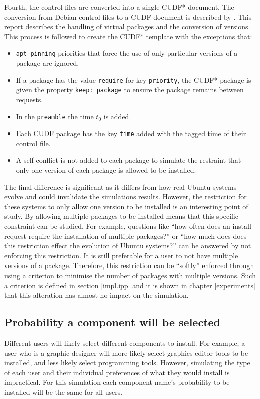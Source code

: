 Fourth, the control files are converted into a single CUDF* document.
The conversion from Debian control files to a CUDF document is described by \cite{abatetrenen2010}.
This report describes the handling of virtual packages and the conversion of versions. 
This process is followed to create the CUDF* template with the exceptions that:
\begin{itemize}
  \item \texttt{apt-pinning} priorities that force the use of only particular versions of a package are ignored.
  \item If a package has the value \texttt{require} for key \texttt{priority}, the CUDF* package is given the property \texttt{keep: package} to ensure the package remains between requests.
  \item In the \texttt{preamble} the time $t_0$ is added.
  \item Each CUDF package has the key \texttt{time} added with the tagged time of their control file.
  \item A self conflict is not added to each package to simulate the restraint that only one version of each package is allowed to be installed.
\end{itemize} 
The final difference is significant as it differs from how real Ubuntu systems evolve and could invalidate the simulations results.
However, the restriction for these systems to only allow one version to be installed is an interesting point of study.
By allowing multiple packages to be installed means that this specific constraint can be studied.
For example, questions like ``how often does an install request require the installation of multiple packages?'' 
or ``how much does does this restriction effect the evolution of Ubuntu systems?'' can be answered by not enforcing this restriction.
It is still preferable for a user to not have multiple versions of a package.
Therefore, this restriction can be ``softly'' enforced through using a criterion to minimise the number of packages with multiple versions.
Such a criterion is defined in section \ref{impl.ipp} and it is shown in chapter \ref{experiments} that this alteration has almost no impact on the simulation.

\subsection{Probability a component will be selected}
Different users will likely select different components to install.
For example, a user who is a graphic designer will more likely select graphics editor tools to be installed, and less likely select programming tools.
However, simulating the type of each user and their individual preferences of what they would install is impractical.
For this simulation each component name's probability to be installed will be the same for all users.

